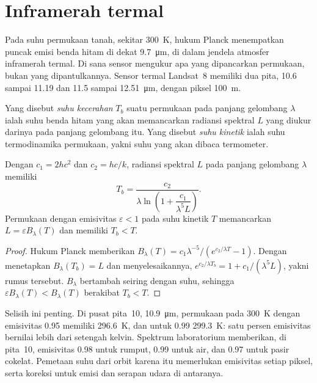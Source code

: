 \section{Inframerah termal}\label{sec:b3:remote-sensing-gis:thermal}

Pada suhu permukaan tanah, sekitar \qty{300}{K}, hukum Planck menempatkan
puncak emisi benda hitam di dekat \qty{9.7}{\micro\metre}, di dalam
jendela atmosfer inframerah termal. Di sana sensor mengukur apa yang
dipancarkan permukaan, bukan yang dipantulkannya. Sensor termal Landsat~8
memiliki dua pita, 10.6 sampai 11.19 dan 11.5 sampai \qty{12.51}{\micro\metre}, dengan
piksel \qty{100}{m}.

\begin{definition}\label{def:b3:remote-sensing-gis:brightness}
Yang disebut \emph{suhu kecerahan} $T_b$ suatu
permukaan pada panjang gelombang $\lambda$ ialah suhu benda hitam
yang akan memancarkan radiansi spektral $L$ yang diukur darinya pada
panjang gelombang itu. Yang disebut \emph{suhu kinetik} ialah suhu termodinamika permukaan,
yakni suhu yang akan dibaca termometer.
\end{definition}

\begin{proposition}\label{prop:b3:remote-sensing-gis:planck-inversion}
Dengan $c_1 = 2hc^2$ dan $c_2 = hc/k$, radiansi spektral $L$ pada
panjang gelombang $\lambda$ memiliki 
\[
T_b = \frac{c_2}{\lambda \ln\!\left(1 + \dfrac{c_1}{\lambda^5 L}\right)} .
\]
Permukaan dengan emisivitas $\varepsilon < 1$ pada suhu kinetik $T$
memancarkan $L = \varepsilon B_\lambda(T)$ dan memiliki $T_b < T$.
\end{proposition}

\begin{proof}
Hukum Planck memberikan $B_\lambda(T) = c_1\lambda^{-5}/(e^{c_2/\lambda T} -
1)$. Dengan menetapkan $B_\lambda(T_b) = L$ dan menyelesaikannya, $e^{c_2/\lambda T_b} = 1 +
c_1/(\lambda^5L)$, yakni rumus tersebut. $B_\lambda$ bertambah seiring dengan
suhu, sehingga $\varepsilon B_\lambda(T) < B_\lambda(T)$ berakibat $T_b < T$.
\end{proof}

Selisih ini penting. Di pusat pita~10, \qty{10.9}{\micro\metre},
permukaan pada \qty{300}{K} dengan emisivitas 0.95 memiliki  \qty{296.6}{K}, dan untuk 0.99 \qty{299.3}{K}: satu persen
emisivitas bernilai lebih dari setengah kelvin. Spektrum laboratorium memberikan,
di pita~10, emisivitas 0.98 untuk rumput, 0.99 untuk air, dan
0.97 untuk pasir cokelat. Pemetaan suhu dari orbit karena itu memerlukan
emisivitas setiap piksel, serta koreksi untuk emisi dan
serapan udara di antaranya.

